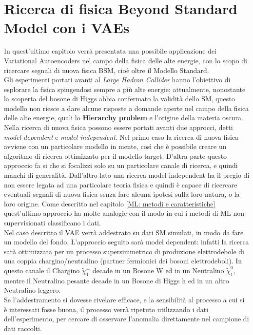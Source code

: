 \section{Ricerca di fisica Beyond Standard Model con i VAEs}
\label{fisica_BSM_VAEs}

In quest'ultimo capitolo verrà presentata una possibile applicazione dei Variational Autoencoders nel campo della fisica delle alte energie, con lo scopo di ricercare segnali di nuova fisica BSM, cioè oltre il Modello Standard. \\
Gli esperimenti portati avanti al \textit{Large Hadron Collider} hanno l'obiettivo di esplorare la fisica spingendosi sempre a più alte energie; attualmente, nonostante la scoperta del bosone di Higgs abbia confermato la validità dello SM, questo modello non riesce a dare alcune risposte a domande aperte nel campo della fisica delle alte energie, quali lo \textbf{Hierarchy problem} e l'origine della materia oscura. \\
Nella ricerca di nuova fisica possono essere portati avanti due approcci, detti \textit{model dependent} e \textit{model independent}. Nel primo caso la ricerca di nuova fisica avviene con un particolare modello in mente, così che è possibile creare un algoritmo di ricerca ottimizzato per il modello target. D'altra parte questo approccio fa si che si focalizzi solo su un particolare canale di ricerca, e quindi manchi di generalità. Dall'altro lato una ricerca model independent ha il pregio di non essere legata ad una particolare teoria fisica e quindi è capace di ricercare eventuali segnali di nuova fisica senza fare alcuna ipotesi sulla loro natura, o la loro origine. Come descritto nel capitolo \ref{ML: metodi e caratteristiche} quest'ultimo approccio ha molte analogie con il modo in cui i metodi di ML non supervisionati classificano i dati.\\
Nel caso descritto il VAE verrà addestrato su dati SM simulati, in modo da fare un modello del fondo. L'approccio seguito sarà model dependent: infatti la ricerca sarà ottimizzata per un processo supersimmetrico di produzione elettrodebole di una coppia chargino/neutralino (partner fermionici dei bosoni elettrodeboli). In questo canale il Chargino $\tilde{\chi}_1^\pm$ decade in un Bosone W ed in un Neutralino $\tilde{\chi}_1^0$, mentre il Neutralino pesante decade in un Bosone di Higgs h ed in un altro Neutralino leggero.\\
Se l'addestramento si dovesse rivelare efficace, e la sensibilità al processo a cui si è interessati fosse buona, il processo verrà ripetuto utilizzando i dati dell'esperimento, per cercare di osservare l'anomalia direttamente nel campione di dati raccolti. \\
